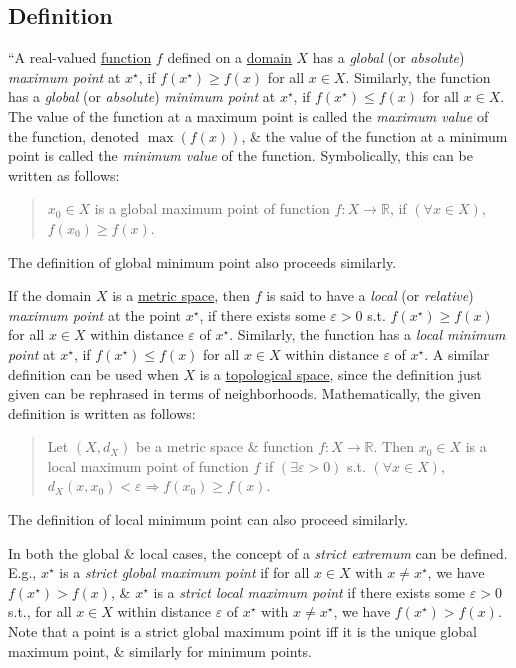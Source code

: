 \documentclass[oneside]{book}
\numberwithin{equation}{section}
\begin{document}
\subsection{Definition}
``A real-valued \href{https://en.wikipedia.org/wiki/Function_(mathematics)}{function} $f$ defined on a \href{https://en.wikipedia.org/wiki/Domain_of_a_function}{domain} $X$ has a \textit{global} (or \textit{absolute}) \textit{maximum point} at $x^\star$, if $f(x^\star)\ge f(x)$ for all $x\in X$. Similarly, the function has a \textit{global} (or \textit{absolute}) \textit{minimum point} at $x^\star$, if $f(x^\star)\le f(x)$ for all $x\in X$. The value of the function at a maximum point is called the \textit{maximum value} of the function, denoted $\max(f(x))$, \& the value of the function at a minimum point is called the \textit{minimum value} of the function. Symbolically, this can be written as follows:
\begin{quotation}
	$x_0\in X$ is a global maximum point of function $f:X\to\mathbb{R}$, if $(\forall x\in X)$, $f(x_0)\ge f(x)$.
\end{quotation}
The definition of global minimum point also proceeds similarly.

If the domain $X$ is a \href{https://en.wikipedia.org/wiki/Metric_space}{metric space}, then $f$ is said to have a \textit{local} (or \textit{relative}) \textit{maximum point} at the point $x^\star$, if there exists some $\varepsilon > 0$ s.t. $f(x^\star)\ge f(x)$ for all $x\in X$ within distance $\varepsilon$ of $x^\star$. Similarly, the function has a \textit{local minimum point} at $x^\star$, if $f(x^\star)\le f(x)$ for all $x\in X$ within distance $\varepsilon$ of $x^\star$. A similar definition can be used when $X$ is a \href{https://en.wikipedia.org/wiki/Topological_space}{topological space}, since the definition just given can be rephrased in terms of neighborhoods. Mathematically, the given definition is written as follows:
\begin{quotation}
	Let $(X,d_X)$ be a metric space \& function $f:X\to\mathbb{R}$. Then $x_0\in X$ is a local maximum point of function $f$ if $(\exists\varepsilon > 0)$ s.t. $(\forall x\in X)$, $d_X(x,x_0) < \varepsilon\Rightarrow f(x_0)\ge f(x)$.
\end{quotation}
The definition of local minimum point can also proceed similarly.

In both the global \& local cases, the concept of a \textit{strict extremum} can be defined. E.g., $x^\star$ is a \textit{strict global maximum point} if for all $x\in X$ with $x\ne x^\star$, we have $f(x^\star) > f(x)$, \& $x^\star$ is a \textit{strict local maximum point} if there exists some $\varepsilon > 0$ s.t., for all $x\in X$ within distance $\varepsilon$ of $x^\star$ with $x\ne x^\star$, we have $f(x^\star) > f(x)$. Note that a point is a strict global maximum point iff it is the unique global maximum point, \& similarly for minimum points.
\end{document}
